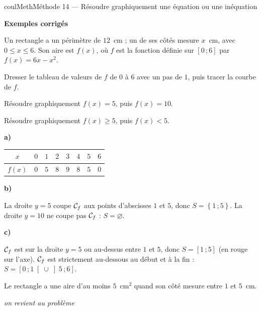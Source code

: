 \documentclass[11pt,a4paper]{article}
\makeatletter
\renewcommand{\le}{\leqslant}
\renewcommand{\ge}{\geqslant}
\newcommand{\lycee@repere}[4]{%
  \draw[grille,step=1] (#1,#2) grid (#3,#4);
  \draw[-{Stealth[length=2mm]},thick] (#1,0)--({#3+0.4},0) node[below left=-1pt]{$x$};
  \draw[-{Stealth[length=2mm]},thick] (0,#2)--(0,{#4+0.4}) node[below left=-1pt]{$y$};
  \node[below left,font=\scriptsize,inner sep=1.5pt] at (0,0) {$0$};}
\newcommand{\lycee@gradx}[1]{\foreach \k/\l in {#1}{%
  \draw (\k,0.07)--(\k,-0.07) node[below,font=\scriptsize,inner sep=1.5pt]{$\l$};}}
\newcommand{\lycee@grady}[1]{\foreach \k/\l in {#1}{%
  \draw (0.07,\k)--(-0.07,\k) node[left,font=\scriptsize,inner sep=1.5pt]{$\l$};}}
\newcommand{\lycee@intff}[2]{\left[#1\,;#2\right]}
\newcommand{\lycee@intfo}[2]{\left[#1\,;#2\right[}
\newcommand{\lycee@intof}[2]{\left]#1\,;#2\right]}
\newcommand{\lycee@ens}[1]{\left\{#1\right\}}
\providecommand{\repere}{\lycee@repere}%
\providecommand{\gradx}{\lycee@gradx}%
\providecommand{\grady}{\lycee@grady}%
\providecommand{\Cf}{\mathcal{C}\sb{f}}%
\providecommand{\intff}{\lycee@intff}%
\providecommand{\intfo}{\lycee@intfo}%
\providecommand{\intof}{\lycee@intof}%
\providecommand{\ens}{\lycee@ens}}
\newcounter{lycee@signet}
\newcommand{\signet}[3][]{\stepcounter{lycee@signet}%
  \edef\lycee@dest{\if\relax\detokenize{#1}\relax
    signet.\arabic{lycee@signet}\else#1\fi}%
  \hypertarget{\lycee@dest}{}\bookmark[level=#2,dest=\lycee@dest]{#3}}
\newcommand{\res}[1]{#1}
\newcounter{methode}
\newenvironment{methodebox}[1][Méthode]{\stepcounter{methode}%
  \begin{boitecours}[phantom={\signet[methode-\arabic{methode}]{2}{#1}}]{coulMeth}{#1}}%
  {\end{boitecours}}
\newcommand{\etape}[1]{\par\smallskip\textbf{\color{coulMeth}#1}\par\nobreak\smallskip}
\newcommand{\explique}[2]{\par\smallskip\noindent
  \begin{minipage}[t]{0.57\linewidth}\raggedright #1\end{minipage}\hfill
  \begin{minipage}[t]{0.40\linewidth}\raggedright\leavevmode
    {\small\itshape\color{black!60}#2}\end{minipage}\par}
\newcommand{\cas}[1]{\par\smallskip\noindent\textbf{\color{coulExo}#1}\vadjust{\nobreak}}
\newenvironment{correction}{\par}{\par}
\newcommand{\etapeexemples}{\etape{Exemples corrigés}}
\makeatother
\begin{document}
\begin{methodebox}[Méthode 14 --- Résoudre graphiquement une équation ou une inéquation]
\etapeexemples
Un rectangle a un périmètre de $12$~cm ; un de ses côtés mesure $x$~cm, avec
$0\le x\le 6$. Son aire est $f(x)$, où $f$ est la fonction définie sur $\intff{0}{6}$ par
${f(x)=6x-x^{2}}$.
\begin{questions}[label=\alph*)]
  \item Dresser le tableau de valeurs de $f$ de $0$ à $6$ avec un pas de $1$, puis tracer
        la courbe de $f$.
  \item Résoudre graphiquement $f(x)=5$, puis $f(x)=10$.
  \item Résoudre graphiquement $f(x)\ge 5$, puis $f(x)<5$.
\end{questions}
\begin{correction}
\begin{minipage}[t]{0.58\linewidth}\raggedright
\cas{a)}\par\nopagebreak
\begin{center}
\renewcommand{\arraystretch}{1.25}
\begin{tabular}{|c|*{7}{c|}}
\hline
$x$ & $0$ & $1$ & $2$ & $3$ & $4$ & $5$ & $6$\\\hline
$f(x)$ & $0$ & $5$ & $8$ & $9$ & $8$ & $5$ & $0$\\\hline
\end{tabular}
\end{center}
\cas{b)}\par\nopagebreak
La droite $y=5$ coupe $\Cf$ aux points d'abscisses $1$ et $5$, donc ${S=\res{\ens{1\,;5}}}$.
La droite $y=10$ ne coupe pas $\Cf$ : ${S=\res{\varnothing}}$.

\cas{c)}\par\nopagebreak
$\Cf$ est sur la droite $y=5$ ou au-dessus entre $1$ et $5$, donc ${S=\res{\intff{1}{5}}}$
(en rouge sur l'axe).
$\Cf$ est strictement au-dessous au début et à la fin :
${S=\res{\intfo{0}{1}\cup\intof{5}{6}}}$.
\end{minipage}\hfill
\begin{minipage}[t]{0.38\linewidth}
\vspace{0pt}\centering
{}
\end{minipage}
\explique{Le rectangle a une aire d'au moins $5$~cm$^{2}$ quand son côté mesure entre
$1$ et $5$~cm.}{on revient au problème}
\end{correction}


\end{methodebox}
\end{document}
